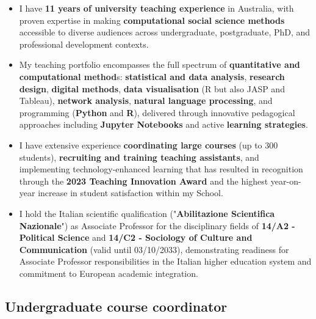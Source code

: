 \documentclass[12pt,a4paper,sans]{moderncv}
\begin{document}
\begin{boxH}
\begin{itemize}
\item I have \textbf{11 years of university teaching experience} in Australia, with proven expertise in making \textbf{computational social science methods} accessible to diverse audiences across undergraduate, postgraduate, PhD, and professional development contexts.
\item My teaching portfolio encompasses the full spectrum of \textbf{quantitative and computational method}s: \textbf{statistical and data analysis}, \textbf{research design}, \textbf{digital methods}, \textbf{data visualisation} (R but also JASP and Tableau), \textbf{network analysis}, \textbf{natural language processing}, and programming (\textbf{Python} and \textbf{R}), delivered through innovative pedagogical approaches including \textbf{Jupyter Notebooks} and active \textbf{learning strategies}.
\item I have extensive experience \textbf{coordinating large courses} (up to 300 students), \textbf{recruiting and training teaching assistants}, and implementing technology-enhanced learning that has resulted in recognition through the\textbf{ 2023 Teaching Innovation Award} and the highest year-on-year increase in student satisfaction within my School.
\item I hold the Italian scientific qualification ("\textbf{Abilitazione Scientifica Nazionale}") as Associate Professor for the disciplinary fields of \textbf{14/A2 - Political Science} and \textbf{14/C2 - Sociology of Culture and Communication} (valid until 03/10/2033), demonstrating readiness for Associate Professor responsibilities in the Italian higher education system and commitment to European academic integration.
\end{itemize}
\end{boxH}

\subsection{\hspace{-2.5cm}Undergraduate course coordinator}

\vspace{.5em}

\end{document}

